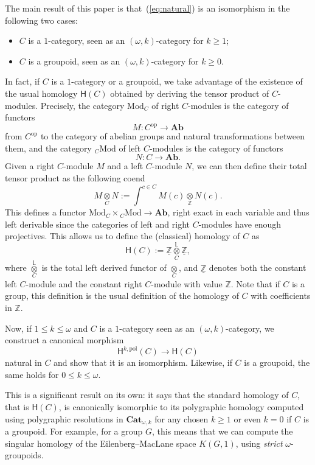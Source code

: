 \documentclass[reqno]{amsart}
\theoremstyle{plain}
\theoremstyle{definition}
\theoremstyle{remark}
\newcommand{\nmbr}[1]{\mathbb #1}
\newcommand{\Z}{\nmbr{Z}}
\newcommand{\pair}[2]{(#1,#2)}       %
\newcommand{\op}{{\mathrm{op}}} %
\newcommand{\ctg}[1]{\mathbf{#1}}  %
\newcommand{\Cat}{\ctg{Cat}}   %
\newcommand{\opCat}[1]{\Cat_{\omega,#1}} %
\newcommand{\Ab}{\ctg{Ab}} %
\newcommand{\RMod}[1]{\mathrm{Mod}_{#1}} %
\newcommand{\LMod}[1]{{}_{#1}\mathrm{Mod}} %
\newcommand{\functor}[1]{\mathsf{#1}} %
\newcommand{\oo}{\ensuremath{\omega}}
\newcommand{\ook}[1]{\ensuremath{\pair{\omega}{#1}}}
\newcommand{\tens}[1]{\underset{#1}{\otimes}} %
\newcommand{\Ltens}[1]{\overset{\LL}{\tens{#1}}} %
\newcommand{\cst}[1]{\underline{#1}} %
\newcommand{\Ho}{\functor{H}} %
\newcommand{\LL}{\mathbb{L}} %
\newcommand{\Hop}[1]{\Ho^{#1,\mathrm{pol}}} %
\newcommand{\nbd}{\nobreakdash} %
\begin{document}
The main result of this paper is that~(\ref{eq:natural}) is an
isomorphism in the following two cases:
\begin{itemize}
\item $C$ is a $1$-category, seen as an \ook k-category for $k\geq 1$;
  \item $C$ is a groupoid, seen as an \ook k-category for $k\geq 0$.
  \end{itemize}
In fact, if $C$ is a $1$-category or a groupoid,  we take advantage of the existence
of the usual homology $\Ho(C)$ obtained by deriving the tensor product
of $C$-modules. Precisely, the
category $\RMod{C}$ of right $C$\nbd-modules is the category of
functors \[M \colon C^{\op} \to \Ab\] from $C^{\op}$ to the
  category of abelian groups and natural transformations between them,
  and the category $\LMod{C}$ of left $C$\nbd-modules is the category
  of functors \[N \colon C \to \Ab.\] Given a right $C$\nbd-module $M$ and a
  left $C$\nbd-module $N$, we can then define their total tensor
  product as the following coend
  \[
    M \tens{C}N := \int^{c \in C}M(c)\tens{\Z} N(c).
  \]
  This defines a functor $\RMod{C}\times \LMod{C} \to \Ab$,
   right exact in each variable and thus left derivable since the
  categories of left and right $C$\nbd-modules have enough
  projectives. This allows us to define the (classical) homology of $C$
  as
  \[
    \Ho(C):=\cst{\Z}\Ltens{C}\cst{\Z},
  \]
  where $\Ltens{C}$ is the total left derived functor of $\tens{C}$,
  and $\cst{\Z}$ denotes both the constant left $C$\nbd-module and the
  constant right
  $C$\nbd-module with value $\Z$. Note that if $C$ is a
  group, this definition is the usual definition of the homology
  of $C$ with coefficients in $\Z$.

  Now, if $1\leq k\leq \oo$ and $C$ is a $1$-category seen as an  \ook
  k-category, we construct a canonical morphism
  \begin{equation}
    \label{eq:poltoclassical}
     \Hop k (C) \to \Ho(C)
   \end{equation}
   natural in $C$ and show that it is an
   isomorphism. Likewise, if $C$ is a groupoid, the same holds
   for $0\leq k\leq \oo$.

 This is a significant result on its own: it says that the
  standard homology of $C$, that is $\Ho(C)$, is canonically
  isomorphic to its polygraphic homology computed using polygraphic
  resolutions in $\opCat{k}$ for any chosen $k\geq 1$ or even $k=0$ if $C$ is
  a groupoid. For example, for a group $G$, this means that we can
  compute the singular homology of the Eilenberg--MacLane space
  $K(G,1)$, using \emph{strict} $\oo$\nbd-groupoids.
\end{document}
